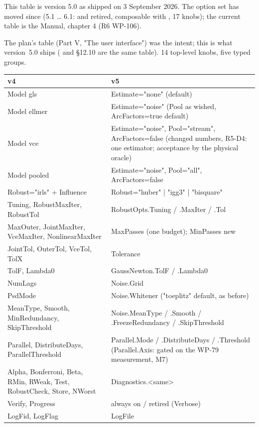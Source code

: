 \begin{principle}
This table is version 5.0 as shipped on 3 September 2026. The option set has moved since (5.1 \ldots{} 6.1:  and  retired,  composable with , 17 knobs); the current table is the Manual, chapter 4 (R6 WP-106).
\end{principle}

The plan's table (Part V, "The user interface") was the intent; this is what
version~5.0 ships ( and 
\S12.10 are the same table). 14 top-level knobs, five typed groups.

\begin{longtable}{@{}P{56mm}P{98mm}@{}}
\toprule
v4 & v5\\
\midrule
Model gls & Estimate="none" (default)\\
Model ellmer & Estimate="noise" (Pool as wished, ArcFactors=true default)\\
Model vce & Estimate="noise", Pool="stream", ArcFactors=false (changed numbers, R5-D4: one estimator; acceptance by the physical oracle)\\
Model pooled & Estimate="noise", Pool="all", ArcFactors=false\\
Robust="irls" + Influence & Robust="huber" | "igg3" | "bisquare"\\
Tuning, RobustMaxIter, RobustTol & RobustOpts.Tuning / .MaxIter / .Tol\\
MaxOuter, JointMaxIter, VceMaxIter, NonlinearMaxIter & MaxPasses (one budget); MinPasses new\\
JointTol, OuterTol, VceTol, TolX & Tolerance\\
TolF, Lambda0 & GaussNewton.TolF / .Lambda0\\
NumLags & Noise.Grid\\
PsdMode & Noise.Whitener ("toeplitz" default, as before)\\
MeanType, Smooth, MinRedundancy, SkipThreshold & Noise.MeanType / .Smooth / .FreezeRedundancy / .SkipThreshold\\
Parallel, DistributeDays, ParallelThreshold & Parallel.Mode / .DistributeDays / .Threshold (Parallel.Axis: gated on the WP-79 measurement, M7)\\
Alpha, Bonferroni, Beta, RMin, RWeak, Test, RobustCheck, Store, NWorst & Diagnostics.<same>\\
Verify, Progress & always on / retired (Verbose)\\
LogFid, LogFlag & LogFile\\

\end{longtable}
